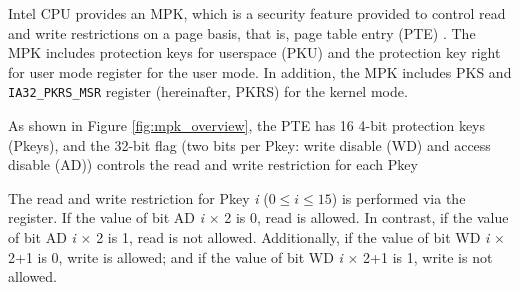
Intel CPU provides an MPK, which is a security feature provided to control read
and write restrictions on a page basis, that is, page table entry (PTE)
\cite{intel-mpk}.
%
The MPK includes protection keys for userspace (PKU) and the protection key
right for user mode register for the user mode.
In addition, the MPK includes PKS and \verb|IA32_PKRS_MSR| register
(hereinafter, PKRS) for the kernel mode.

As shown in Figure \ref{fig:mpk_overview}, the PTE has 16 4-bit protection keys
(Pkeys), and the 32-bit flag (two bits per Pkey: write disable (WD) and access
disable (AD)) controls the read and write restriction for each Pkey 

The read and write restriction for Pkey {\it i} ($0 \leq i \leq 15$) is performed via the
register. If the value of bit AD {\it i} $\times$ 2 is 0, read is allowed. In contrast,
if the value of bit AD {\it i} $\times$ 2 is 1, read is not allowed.
%
Additionally, if the value of bit WD {\it i} $\times$ 2+1 is 0, write is allowed; and if the
value of bit WD {\it i} $\times$ 2+1 is 1, write is not allowed.







